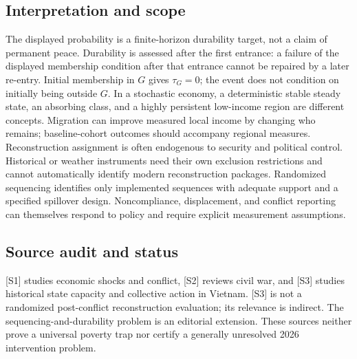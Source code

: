 \documentclass[11pt,a4paper]{article}
\begin{document}
\subsection*{Interpretation and scope}
The displayed probability is a finite-horizon durability target, not a claim of permanent peace. Durability is assessed after the first entrance: a failure of the displayed membership condition after that entrance cannot be repaired by a later re-entry. Initial membership in $G$ gives $\tau_G=0$; the event does not condition on initially being outside $G$. In a stochastic economy, a deterministic stable steady state, an absorbing class, and a highly persistent low-income region are different concepts. Migration can improve measured local income by changing who remains; baseline-cohort outcomes should accompany regional measures. Reconstruction assignment is often endogenous to security and political control. Historical or weather instruments need their own exclusion restrictions and cannot automatically identify modern reconstruction packages. Randomized sequencing identifies only implemented sequences with adequate support and a specified spillover design. Noncompliance, displacement, and conflict reporting can themselves respond to policy and require explicit measurement assumptions.
\subsection*{Source audit and status}
[S1] studies economic shocks and conflict, [S2] reviews civil war, and [S3] studies historical state capacity and collective action in Vietnam. [S3] is not a randomized post-conflict reconstruction evaluation; its relevance is indirect. The sequencing-and-durability problem is an editorial extension. These sources neither prove a universal poverty trap nor certify a generally unresolved 2026 intervention problem.
\end{document}
